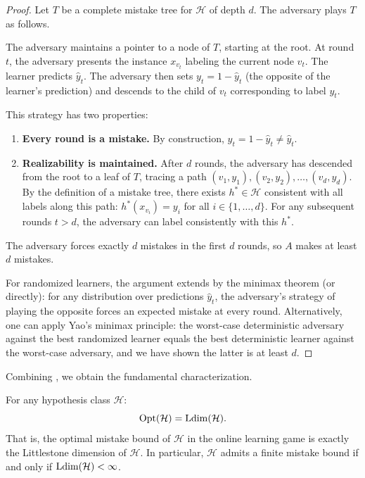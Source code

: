 \begin{proof}
Let $T$ be a complete mistake tree for $\mathcal{H}$ of depth $d$. The adversary plays $T$ as follows.

The adversary maintains a pointer to a node of $T$, starting at the root. At round $t$, the adversary presents the instance $x_{v_t}$ labeling the current node $v_t$. The learner predicts $\hat{y}_t$. The adversary then sets $y_t = 1 - \hat{y}_t$ (the opposite of the learner's prediction) and descends to the child of $v_t$ corresponding to label $y_t$.

This strategy has two properties:
\begin{enumerate}[leftmargin=*, itemsep=2pt]
\item \textbf{Every round is a mistake.} By construction, $y_t = 1 - \hat{y}_t \neq \hat{y}_t$.
\item \textbf{Realizability is maintained.} After $d$ rounds, the adversary has descended from the root to a leaf of $T$, tracing a path $(v_1, y_1), (v_2, y_2), \ldots, (v_d, y_d)$. By the definition of a mistake tree, there exists $h^* \in \mathcal{H}$ consistent with all labels along this path: $h^*(x_{v_i}) = y_i$ for all $i \in \{1, \ldots, d\}$. For any subsequent rounds $t > d$, the adversary can label consistently with this $h^*$.
\end{enumerate}

The adversary forces exactly $d$ mistakes in the first $d$ rounds, so $A$ makes at least $d$ mistakes.

For randomized learners, the argument extends by the minimax theorem (or directly): for any distribution over predictions $\hat{y}_t$, the adversary's strategy of playing the opposite forces an expected mistake at every round. Alternatively, one can apply Yao's minimax principle: the worst-case deterministic adversary against the best randomized learner equals the best deterministic learner against the worst-case adversary, and we have shown the latter is at least $d$.
\end{proof}

Combining , we obtain the fundamental characterization.

\begin{thm}
\label{thm:littlestone-characterization}
For any hypothesis class $\mathcal{H}$:
\[
\mathrm{Opt}(\mathcal{H}) = \mathrm{Ldim}(\mathcal{H}).
\]
That is, the optimal mistake bound of $\mathcal{H}$ in the online learning game is exactly the Littlestone dimension of $\mathcal{H}$. In particular, $\mathcal{H}$ admits a finite mistake bound if and only if $\mathrm{Ldim}(\mathcal{H}) < \infty$.
\end{thm}

